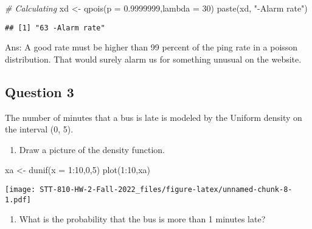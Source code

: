 \documentclass[
]{article}
\newenvironment{Shaded}{\begin{snugshade}}{\end{snugshade}}
\newcommand{\AttributeTok}[1]{\textcolor[rgb]{0.77,0.63,0.00}{#1}}
\newcommand{\CommentTok}[1]{\textcolor[rgb]{0.56,0.35,0.01}{\textit{#1}}}
\newcommand{\DecValTok}[1]{\textcolor[rgb]{0.00,0.00,0.81}{#1}}
\newcommand{\FloatTok}[1]{\textcolor[rgb]{0.00,0.00,0.81}{#1}}
\newcommand{\FunctionTok}[1]{\textcolor[rgb]{0.00,0.00,0.00}{#1}}
\newcommand{\NormalTok}[1]{#1}
\newcommand{\OtherTok}[1]{\textcolor[rgb]{0.56,0.35,0.01}{#1}}
\newcommand{\SpecialCharTok}[1]{\textcolor[rgb]{0.00,0.00,0.00}{#1}}
\newcommand{\StringTok}[1]{\textcolor[rgb]{0.31,0.60,0.02}{#1}}
\providecommand{\tightlist}{%
  \setlength{\itemsep}{0pt}\setlength{\parskip}{0pt}}
\begin{document}
\begin{Shaded}
\begin{Highlighting}[]
\CommentTok{\# Calculating }
\NormalTok{xd }\OtherTok{\textless{}{-}} \FunctionTok{qpois}\NormalTok{(}\AttributeTok{p =} \FloatTok{0.9999999}\NormalTok{,}\AttributeTok{lambda =} \DecValTok{30}\NormalTok{)}
\FunctionTok{paste}\NormalTok{(xd, }\StringTok{"{-}Alarm rate"}\NormalTok{)}
\end{Highlighting}
\end{Shaded}

\begin{verbatim}
## [1] "63 -Alarm rate"
\end{verbatim}

Ans: A good rate must be higher than 99 percent of the ping rate in a
poisson distribution. That would surely alarm us for something unusual
on the website.

\hypertarget{question-3}{%
\subsection{Question 3}\label{question-3}}

The number of minutes that a bus is late is modeled by the Uniform
density on the interval (0, 5).

\begin{enumerate}
\def\labelenumi{\alph{enumi}.}
\tightlist
\item
  Draw a picture of the density function.
\end{enumerate}

\begin{Shaded}
\begin{Highlighting}[]
\NormalTok{xa }\OtherTok{\textless{}{-}} \FunctionTok{dunif}\NormalTok{(}\AttributeTok{x =} \DecValTok{1}\SpecialCharTok{:}\DecValTok{10}\NormalTok{,}\DecValTok{0}\NormalTok{,}\DecValTok{5}\NormalTok{)}
\FunctionTok{plot}\NormalTok{(}\DecValTok{1}\SpecialCharTok{:}\DecValTok{10}\NormalTok{,xa)}
\end{Highlighting}
\end{Shaded}

\texttt{[image: STT-810-HW-2-Fall-2022\_files/figure-latex/unnamed-chunk-8-1.pdf]}

\begin{enumerate}
\def\labelenumi{\alph{enumi}.}
\setcounter{enumi}{1}
\tightlist
\item
  What is the probability that the bus is more than 1 minutes late?
\end{enumerate}
\end{document}
